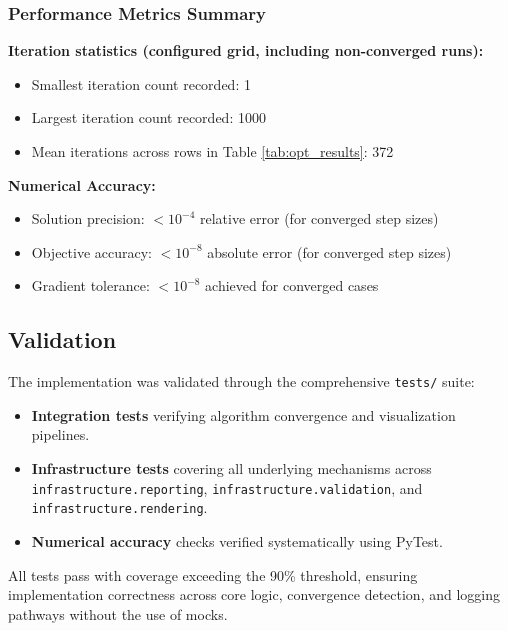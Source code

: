 \documentclass[
]{article}
\providecommand{\tightlist}{%
  \setlength{\itemsep}{0pt}\setlength{\parskip}{0pt}}
\begin{document}
\subsubsection{Performance Metrics
Summary}\label{performance-metrics-summary}

\textbf{Iteration statistics (configured grid, including non-converged
runs):}

\begin{itemize}
\tightlist
\item
  Smallest iteration count recorded: 1
\item
  Largest iteration count recorded: 1000
\item
  Mean iterations across rows in Table \ref{tab:opt_results}: 372
\end{itemize}

\textbf{Numerical Accuracy:}

\begin{itemize}
\tightlist
\item
  Solution precision: \(< 10^{-4}\) relative error (for converged step
  sizes)
\item
  Objective accuracy: \(< 10^{-8}\) absolute error (for converged step
  sizes)
\item
  Gradient tolerance: \(< 10^{-8}\) achieved for converged cases
\end{itemize}

\subsection{Validation}\label{validation}

The implementation was validated through the comprehensive
\texttt{tests/} suite:

\begin{itemize}
\tightlist
\item
  \textbf{Integration tests} verifying algorithm convergence and
  visualization pipelines.
\item
  \textbf{Infrastructure tests} covering all underlying mechanisms
  across \texttt{infrastructure.reporting},
  \texttt{infrastructure.validation}, and
  \texttt{infrastructure.rendering}.
\item
  \textbf{Numerical accuracy} checks verified systematically using
  PyTest.
\end{itemize}

All tests pass with coverage exceeding the 90\% threshold, ensuring
implementation correctness across core logic, convergence detection, and
logging pathways without the use of mocks.
\end{document}
